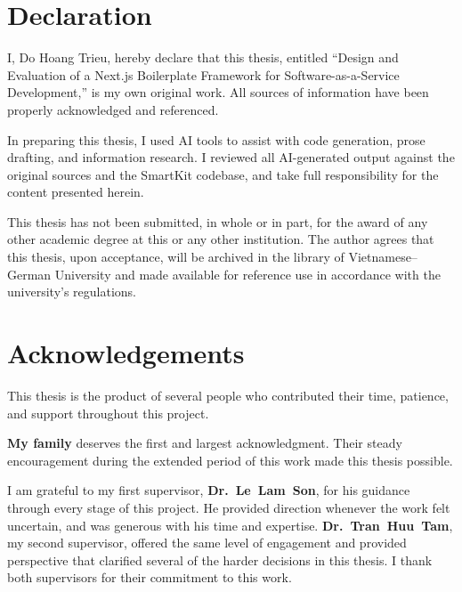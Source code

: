 \documentclass[12pt,a4paper]{report}
\begin{document}

\thispagestyle{empty}

\clearpage

\pagestyle{fancy}

\chapter*{Declaration}

I, Do Hoang Trieu, hereby declare that this thesis, entitled ``Design and Evaluation of a Next.js Boilerplate Framework for Software-as-a-Service Development,'' is my own original work. All sources of information have been properly acknowledged and referenced.

In preparing this thesis, I used AI tools to assist with code generation, prose drafting, and information research. I reviewed all AI-generated output against the original sources and the SmartKit codebase, and take full responsibility for the content presented herein.

This thesis has not been submitted, in whole or in part, for the award of any other academic degree at this or any other institution. The author agrees that this thesis, upon acceptance, will be archived in the library of Vietnamese--German University and made available for reference use in accordance with the university's regulations.


\clearpage

\chapter*{Acknowledgements}

This thesis is the product of several people who contributed their time, patience, and support throughout this project.

\textbf{My family} deserves the first and largest acknowledgment. Their steady encouragement during the extended period of this work made this thesis possible.

I am grateful to my first supervisor, \textbf{Dr.~Le~Lam~Son}, for his guidance through every stage of this project. He provided direction whenever the work felt uncertain, and was generous with his time and expertise. \textbf{Dr.~Tran~Huu~Tam}, my second supervisor, offered the same level of engagement and provided perspective that clarified several of the harder decisions in this thesis. I thank both supervisors for their commitment to this work.
\end{document}
